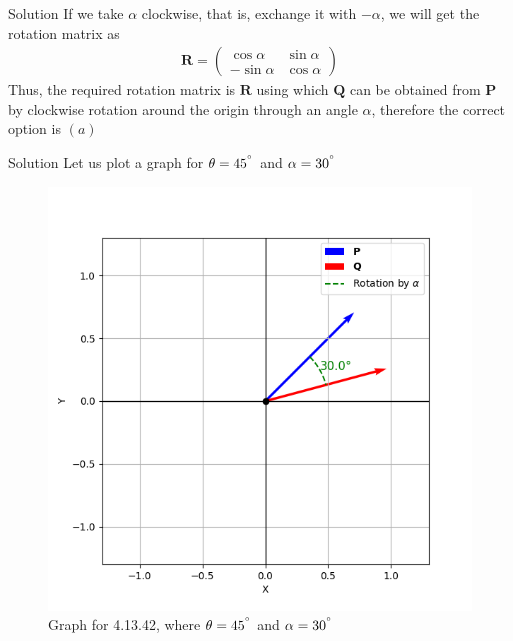 \documentclass{beamer}
\let\vec\mathbf
\providecommand{\brak}[1]{\ensuremath{\left(#1\right)}}
\theoremstyle{remark}
\newcommand{\myvec}[1]{\ensuremath{\begin{pmatrix}#1\end{pmatrix}}}
\begin{document}
\begin{frame}{Solution}
If we take $\alpha$ clockwise, that is, exchange it with $-\alpha$, we will get the rotation matrix as 
\begin{align}
    \vec{R}=\myvec{\cos\alpha & \sin\alpha \\ -\sin{\alpha} & \cos\alpha}
\end{align}
Thus, the required rotation matrix is $\vec{R}$ using which $\vec{Q}$ can be obtained from $\vec{P}$ by clockwise rotation around the origin through an angle $\alpha $, therefore the correct option is $\brak{a}$\\   
\end{frame}
\begin{frame}{Solution}
 Let us plot a graph for $\theta=45^{\degree}$ and $\alpha=30^{\degree}$
\begin{figure}[H]
    \centering
    \includegraphics[width=0.5\columnwidth]{figs/1.png}
    \caption{Graph for 4.13.42, where $\theta=45^{\degree}$ and $\alpha=30^{\degree}$}
    \label{fig:placeholder}
\end{figure}  
\end{frame}
\end{document}
